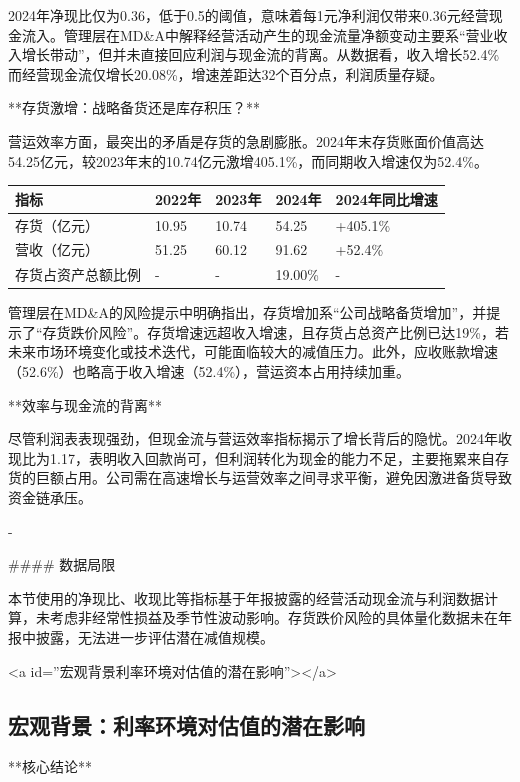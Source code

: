\documentclass[12pt,a4paper]{article}
\begin{document}
2024年净现比仅为0.36，低于0.5的阈值，意味着每1元净利润仅带来0.36元经营现金流入。管理层在MD\&A中解释经营活动产生的现金流量净额变动主要系“营业收入增长带动”，但并未直接回应利润与现金流的背离。从数据看，收入增长52.4\%而经营现金流仅增长20.08\%，增速差距达32个百分点，利润质量存疑。

**存货激增：战略备货还是库存积压？**

营运效率方面，最突出的矛盾是存货的急剧膨胀。2024年末存货账面价值高达54.25亿元，较2023年末的10.74亿元激增405.1\%，而同期收入增速仅为52.4\%。

\begin{table}[htbp]
\centering
\begin{tabular}{lllll}
\toprule
指标 & 2022年 & 2023年 & 2024年 & 2024年同比增速 \\
\midrule
存货（亿元） & 10.95 & 10.74 & 54.25 & +405.1\% \\
营收（亿元） & 51.25 & 60.12 & 91.62 & +52.4\% \\
存货占资产总额比例 & - & - & 19.00\% & - \\
\bottomrule
\end{tabular}
\end{table}


管理层在MD\&A的风险提示中明确指出，存货增加系“公司战略备货增加”，并提示了“存货跌价风险”。存货增速远超收入增速，且存货占总资产比例已达19\%，若未来市场环境变化或技术迭代，可能面临较大的减值压力。此外，应收账款增速（52.6\%）也略高于收入增速（52.4\%），营运资本占用持续加重。

**效率与现金流的背离**

尽管利润表表现强劲，但现金流与营运效率指标揭示了增长背后的隐忧。2024年收现比为1.17，表明收入回款尚可，但利润转化为现金的能力不足，主要拖累来自存货的巨额占用。公司需在高速增长与运营效率之间寻求平衡，避免因激进备货导致资金链承压。

-

\#\#\#\# 数据局限

本节使用的净现比、收现比等指标基于年报披露的经营活动现金流与利润数据计算，未考虑非经常性损益及季节性波动影响。存货跌价风险的具体量化数据未在年报中披露，无法进一步评估潜在减值规模。

<a id=''宏观背景利率环境对估值的潜在影响''></a>

\subsection{ 宏观背景：利率环境对估值的潜在影响}

**核心结论**
\end{document}
